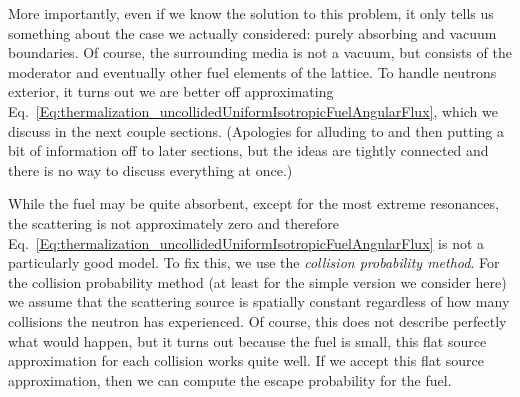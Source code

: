 More importantly, even if we know the solution to this problem, it only tells us something about the case we actually considered: purely absorbing and vacuum boundaries. Of course, the surrounding media is not a vacuum, but consists of the moderator and eventually other fuel elements of the lattice. To handle neutrons exterior, it turns out we are better off approximating Eq.~\eqref{Eq:thermalization_uncollidedUniformIsotropicFuelAngularFlux}, which we discuss in the next couple sections. (Apologies for alluding to and then putting a bit of information off to later sections, but the ideas are tightly connected and there is no way to discuss everything at once.) 

While the fuel may be quite absorbent, except for the most extreme resonances, the scattering is not approximately zero and therefore Eq.~\eqref{Eq:thermalization_uncollidedUniformIsotropicFuelAngularFlux} is not a particularly good model. To fix this, we use the \emph{collision probability method}. For the collision probability method (at least for the simple version we consider here) we assume that the scattering source is spatially constant regardless of how many collisions the neutron has experienced. Of course, this does not describe perfectly what would happen, but it turns out because the fuel is small, this flat source approximation for each collision works quite well. If we accept this flat source approximation, then we can compute the escape probability for the fuel. 

